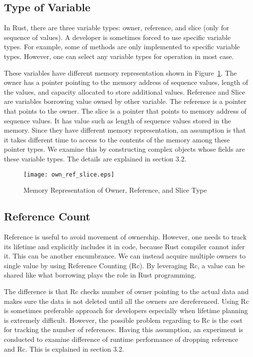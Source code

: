 \subsection{Type of Variable}
\label{sec:history}
In Rust, there are three variable types: owner, reference, and slice (only for sequence of values). 
A developer is sometimes forced to use specific variable types. For example, some of methods are only implemented to specific variable types.
However, one can select any variable types for operation in most case.

These variables have different memory representation shown in Figure~\ref{fig:own_ref_slice}.
The owner has a pointer pointing to the memory address of sequence values, length of the values, and capacity allocated to store additional values. 
Reference and Slice are variables borrowing value owned by other variable. The reference is a pointer that points to the owner. 
The slice is a pointer that points to memory address of sequence values. It has value such as length of sequence values stored in the memory. 
Since they have different memory representation, an assumption is that it takes different time to access to the contents of the memory among these pointer types.
We examine this by constructing complex objects whose fields are these variable types. The details are explained in section 3.2.

\begin{figure}[htb]
    \texttt{[image: own\_ref\_slice.eps]}
    \caption{Memory Representation of Owner, Reference, and Slice Type}
    \label{fig:own_ref_slice}
\end{figure}

\subsection{Reference Count}
\label{sec:history}
Reference is useful to avoid movement of ownership. However, one needs to track its lifetime and explicitly includes it in code, 
because Rust compiler cannot infer it. This can be another encumbrance. We can instead acquire multiple owners to single value by using Reference Counting (Rc). 
By leveraging Rc, a value can be shared like what borrowing plays the role in Rust programming. 

The difference is that Rc checks number of owner pointing to the actual data and makes sure the data is not deleted 
until all the owners are dereferenced. Using Rc is sometimes preferable approach for developers especially when lifetime planning is extremely difficult.
However, the possible problem regarding to Rc is the cost for tracking the number of references. 
Having this assumption, an experiment is conducted to examine difference of runtime performance of dropping reference and Rc. 
This is explained in section 3.2.


